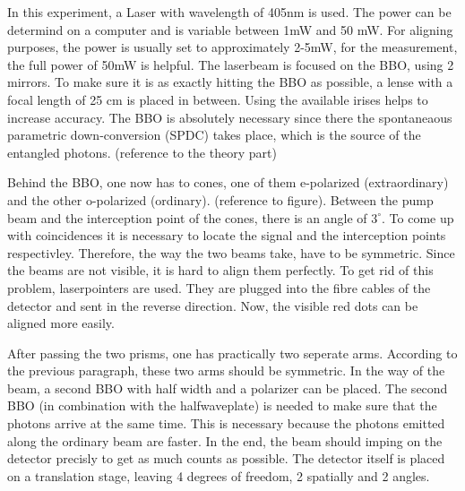 \documentclass[12pt,a4paper]{article}
\begin{document}
\begin{multicols}{2}
In this experiment, a Laser with wavelength of 405nm is used. The power can be determind on a computer and is variable between 1mW and 50 mW. For aligning purposes, the power is usually set to approximately 2-5mW, for the measurement, the full power of 50mW is helpful. 
The laserbeam is  focused on the BBO, using 2 mirrors. To make sure it is as exactly hitting the BBO as possible, a lense with a focal length of 25 cm is placed in between. Using the available irises helps to increase accuracy. The BBO is absolutely necessary since there the spontaneaous parametric down-conversion (SPDC) takes place, which is the source of the entangled photons. (reference to the theory part)

 Behind the BBO, one now has to cones, one of them e-polarized (extraordinary) and the other o-polarized (ordinary). (reference to figure). Between the pump beam and the interception point of the cones, there is an angle of $3^\circ$. To come up with coincidences it is  necessary to locate the signal and the interception points respectivley. Therefore, the way the two beams take, have to be symmetric. Since the beams are not visible, it is hard to align them perfectly. To get rid of this problem, laserpointers are used. They are plugged into the fibre cables of the detector and sent in the reverse direction. Now, the visible red dots can be aligned more easily.
 
 After passing the two prisms, one has practically two seperate arms. According to the previous paragraph, these two arms should be symmetric. In the way of the beam, a second BBO with half width and a polarizer can be placed. The second BBO (in combination with the halfwaveplate) is needed to make sure that the photons arrive at the same time. This is necessary because the photons emitted along the ordinary beam are faster. In the end, the beam should imping on the detector precisly to get as much counts as possible. The detector itself is placed on a translation stage, leaving 4 degrees of freedom, 2 spatially and 2 angles. 
 





\end{multicols}
\end{document}
